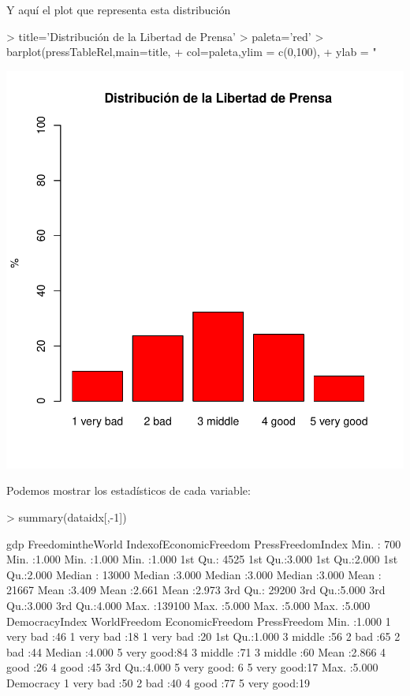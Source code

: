\documentclass{article}
\begin{document}
Y aquí el plot que representa esta distribución
\begin{Schunk}
\begin{Sinput}
> title='Distribución de la Libertad de Prensa'
> paleta='red'
> barplot(pressTableRel,main=title,
+         col=paleta,ylim = c(0,100),
+         ylab = "%
\end{Sinput}
\end{Schunk}
\includegraphics{paperVersion_0-pressTableRelPlot}


Podemos mostrar los estadísticos de cada variable:
\begin{Schunk}
\begin{Sinput}
> summary(dataidx[,-1])
\end{Sinput}
\begin{Soutput}
      gdp         FreedomintheWorld IndexofEconomicFreedom PressFreedomIndex
 Min.   :   700   Min.   :1.000     Min.   :1.000          Min.   :1.000    
 1st Qu.:  4525   1st Qu.:3.000     1st Qu.:2.000          1st Qu.:2.000    
 Median : 13000   Median :3.000     Median :3.000          Median :3.000    
 Mean   : 21667   Mean   :3.409     Mean   :2.661          Mean   :2.973    
 3rd Qu.: 29200   3rd Qu.:5.000     3rd Qu.:3.000          3rd Qu.:4.000    
 Max.   :139100   Max.   :5.000     Max.   :5.000          Max.   :5.000    
 DemocracyIndex       WorldFreedom    EconomicFreedom      PressFreedom
 Min.   :1.000   1 very bad :46    1 very bad :18     1 very bad :20   
 1st Qu.:1.000   3 middle   :56    2 bad      :65     2 bad      :44   
 Median :4.000   5 very good:84    3 middle   :71     3 middle   :60   
 Mean   :2.866                     4 good     :26     4 good     :45   
 3rd Qu.:4.000                     5 very good: 6     5 very good:17   
 Max.   :5.000                                                         
       Democracy 
 1 very bad :50  
 2 bad      :40  
 4 good     :77  
 5 very good:19  
\end{Soutput}
\end{Schunk}
\end{document}
